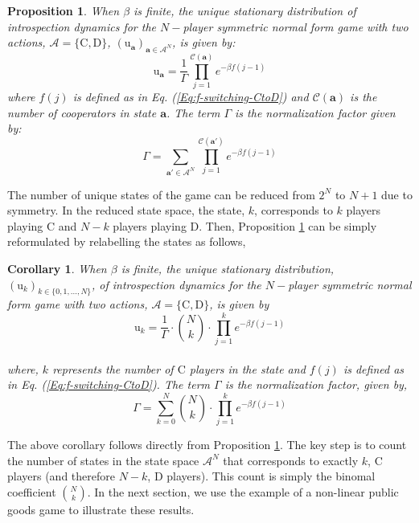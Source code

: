 \documentclass[11pt]{article}
\theoremstyle{plainCl1}
\newtheorem{Prop}{Proposition}
\theoremstyle{plainCl2}
\newtheorem{Corollary}{Corollary}
\newcommand{\abf}{\mathbf{a}}
\newcommand{\C}{\mathrm{C}}
\newcommand{\D}{\mathrm{D}}
\begin{document}
\begin{Prop}
\label{Prop:Symmetric-2-strategies-state}
When $\beta$ is finite, the unique stationary distribution of introspection dynamics for the $N-$player symmetric normal form game with two actions, $\mathcal{A} = \{\C, \D \}$, $(\mathrm{u}_{\abf})_{\abf \in \mathcal{A}^N}$, is given by:
\begin{equation}
\label{Eq:stationary-dist-symm-2-stgs-state}
\mathrm{u}_\abf = \frac{1}{\Gamma} \displaystyle \prod_{j=1}^{\mathcal{C}(\abf)} \displaystyle e^{-\beta f(j-1)}
\end{equation}
where $f(j)$ is defined as in Eq. (\ref{Eq:f-switching-CtoD}) and $\mathcal{C}(\abf)$ is the number of cooperators in state $\abf$. The term $\Gamma$ is the normalization factor given by:
\begin{equation}
\label{Eq:stationary-dist-normalization-symm-2-stgs-state}
\Gamma = \displaystyle \sum_{\abf' \in \mathcal{A}^N} \prod_{j = 1}^{\mathcal{C}(\abf')} \displaystyle e^{-\beta f(j-1)}
\end{equation}
\end{Prop}


\noindent The number of unique states of the game can be reduced from $2^N$ to $N+1$  due to symmetry. In the reduced state space, the state, $k$, corresponds to $k$ players playing $\C$ and $N-k$ players playing $\D$. Then, Proposition \ref{Prop:Symmetric-2-strategies-state} can be simply reformulated by relabelling the states as follows,


\begin{Corollary}
\label{Lemma: Symmetric-2-stg}
When $\beta$ is finite, the unique stationary distribution, $(\mathrm{u}_k)_{k \in \{0,1,...,N\}}$, of introspection dynamics for the $N-$player symmetric normal form game with two actions, $\mathcal{A} = \{\C, \D \}$, is given by \\
\begin{equation}
\label{Eq:stationary-dist-symm-2-stgs}
\mathrm{u}_k = \frac{1}{\Gamma} \cdot {N \choose k} \cdot \displaystyle \prod_{j=1}^{k} \displaystyle e^{-\beta f(j-1)}
\end{equation} \\ 
where, $k$ represents the number of $\C$ players in the state and $f(j)$ is defined as in Eq. (\ref{Eq:f-switching-CtoD}). The term $\Gamma$ is the normalization factor, given by, \\
\begin{equation}
\label{Eq:normalization-Tk}
\Gamma = \displaystyle \sum_{k=0}^N {N \choose k} \cdot \displaystyle \prod_{j=1}^{k} \displaystyle e^{-\beta f(j-1)}
\end{equation}
\end{Corollary}
\noindent The above corollary follows directly from Proposition \ref{Prop:Symmetric-2-strategies-state}. The key step is to count the number of states in the state space $\mathcal{A}^N$ that corresponds to exactly $k$, $\C$ players (and therefore $N-k$, $\D$ players). This count is simply the binomal coefficient $N \choose k$. In the next section, we use the example of a non-linear public goods game to illustrate these results. 
\end{document}
